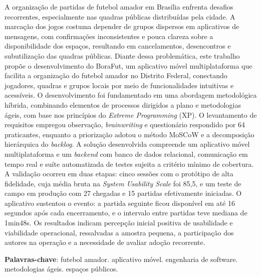 \begin{resumo}
    A organização de partidas de futebol amador em Brasília enfrenta desafios recorrentes, especialmente nas quadras públicas distribuídas pela cidade. A marcação dos jogos costuma depender de grupos dispersos em aplicativos de mensagens, com confirmações inconsistentes e pouca clareza sobre a disponibilidade dos espaços, resultando em cancelamentos, desencontros e subutilização das quadras públicas. Diante dessa problemática, este trabalho propõe o desenvolvimento do BoraFut, um aplicativo móvel multiplataforma que facilita a organização do futebol amador no Distrito Federal, conectando jogadores, quadras e grupos locais por meio de funcionalidades intuitivas e acessíveis. O desenvolvimento foi fundamentado em uma abordagem metodológica híbrida, combinando elementos de processos dirigidos a plano e metodologias ágeis, com base nos princípios do \textit{Extreme Programming} (XP). O levantamento de requisitos empregou observação, \textit{brainwriting} e questionário respondido por 64 praticantes, enquanto a priorização adotou o método MoSCoW e a decomposição hierárquica do \textit{backlog}. A solução desenvolvida compreende um aplicativo móvel multiplataforma e um \textit{backend} com banco de dados relacional, comunicação em tempo real e suíte automatizada de testes sujeita a critério mínimo de cobertura. A validação ocorreu em duas etapas: cinco sessões com o protótipo de alta fidelidade, cuja média bruta na \textit{System Usability Scale} foi 85,5, e um teste de campo em produção com 27 chegadas e 15 partidas efetivamente iniciadas. O aplicativo sustentou o evento: a partida seguinte ficou disponível em até 16 segundos após cada encerramento, e o intervalo entre partidas teve mediana de 1min48s. Os resultados indicam percepção inicial positiva de usabilidade e viabilidade operacional, ressalvadas a amostra pequena, a participação dos autores na operação e a necessidade de avaliar adoção recorrente.

    \vspace{\onelineskip}
    
    \noindent
    \textbf{Palavras-chave}: futebol amador. aplicativo móvel. engenharia de software. metodologias ágeis. espaços públicos.
\end{resumo}
